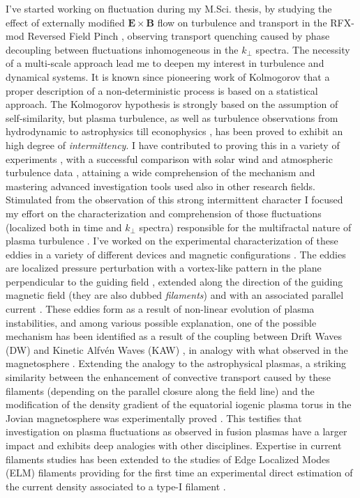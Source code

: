 \documentclass[12pt,a4paper]{article}
\begin{document}
I've started working on fluctuation during my M.Sci. thesis, by
studying the effect of externally modified $\mathbf{E}\times\mathbf{B}$
flow on turbulence and transport in the RFX-mod Reversed Field Pinch
\cite{Antoni:2000p3587}, observing transport quenching caused by
phase decoupling between fluctuations inhomogeneous in the
$k_{\perp}$ spectra. The necessity of a multi-scale approach lead me to deepen my
interest in turbulence and dynamical systems. It is known since
pioneering work of Kolmogorov \cite{Frisch:1996ue} that a proper
description of a non-deterministic process is based on a statistical
approach.  The Kolmogorov hypothesis is strongly based on the
assumption of self-similarity, but plasma turbulence, as well as turbulence observations from hydrodynamic to
astrophysics till econophysics \cite{Sornette:2006dt}, has been proved
to exhibit an high degree of \emph{intermittency}. I have contributed
to proving this in a variety of experiments
\cite{Antoni:2001p662,Vianello:2002p3579}, with a successful comparison 
with solar wind and atmospheric turbulence data
\cite{Carbone:2002p2809}, attaining a wide comprehension of the
mechanism and mastering advanced investigation tools used also in other research
fields. Stimulated from the observation of this strong intermittent
character I focused my effort on the characterization and
comprehension of those fluctuations (localized both in time and
$k_{\perp}$ spectra) responsible for the multifractal nature of plasma turbulence
\cite{Bohr:1998fn}. I've worked on the experimental characterization
of these eddies in a variety
of different devices and magnetic configurations
\cite{Spolaore:2009p4115,Vianello:2010p4670,Furno:2011cs,Spolaore:2015ij}. The
eddies are localized pressure perturbation with a vortex-like pattern in
the plane perpendicular to the guiding field \cite{Antoni:2006p3585},
extended along the direction of the guiding magnetic field (they are also dubbed \emph{filaments})
and with an associated parallel current
\cite{Spolaore:2009p4115,Vianello:2010p4670}. These eddies form as a
result of non-linear evolution of plasma instabilities, and among
various possible explanation,  one of the possible mechanism has been identified as a result
of the coupling between Drift Waves (DW) and Kinetic Alfv{\'e}n Waves
(KAW) \cite{Vianello:2010p4670}, in analogy with what observed in the
magnetosphere \cite{Martines:2009p4483,Sundkvist:2005is}. Extending
the analogy to the astrophysical plasmas, a striking similarity
between the enhancement of convective transport caused by these
filaments (depending on the parallel closure along the field line) and
the modification of the density gradient of the equatorial iogenic
plasma torus in the Jovian magnetosphere \cite{Frank:2002eu} was 
experimentally proved \cite{carralero:prl2015}. This testifies that investigation on
plasma fluctuations as observed in fusion plasmas have a
larger impact and exhibits deep analogies with other disciplines. 
Expertise in
current filaments studies has been extended to the studies of Edge
Localized Modes (ELM)
filaments providing for the first time an experimental direct estimation of the
current density associated to a type-I filament
\cite{PhysRevLett.106.125002,Naulin:2011im,Muller:2011kj,Spolaore:2015tk}.
\end{document}
